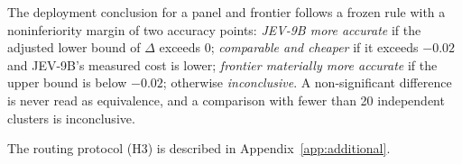 The deployment conclusion for a panel and frontier follows a frozen rule with a noninferiority margin of two accuracy points:
\emph{JEV-9B more accurate} if the adjusted lower bound of $\Delta$ exceeds 0;
\emph{comparable and cheaper} if it exceeds $-0.02$ and JEV-9B's measured cost is lower;
\emph{frontier materially more accurate} if the upper bound is below $-0.02$;
otherwise \emph{inconclusive}.
A non-significant difference is never read as equivalence, and a comparison with fewer than 20 independent clusters is inconclusive.

\ifsubmission
The routing protocol (H3) is described in Appendix~\ref{app:additional}.
\fi
